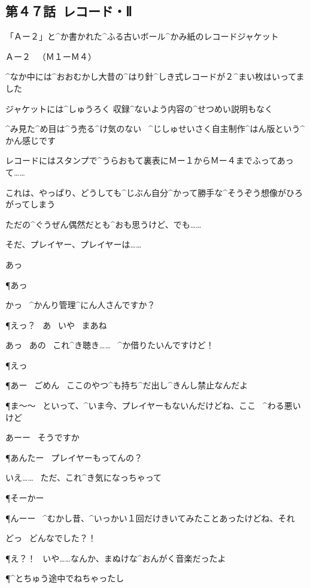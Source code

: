 \subsection{第４７話\ レコード・Ⅱ}

\page[53]
\K 「Ａー２」と^{か}{書}かれた^{ふる}{古}いボール^{かみ}{紙}のレコードジャケット

\Sign Ａー２
\ （Ｍ１ーＭ４）

\K ^{なか}{中}には^{おおむかし}{大昔}の^{はり}{針}^{しき}{式}レコードが２^{まい}{枚}はいってました

\page
\K ジャケットには^{しゅうろく }{収録}^{ないよう}{内容}の^{せつめい}{説明}もなく

\K ^{み}{見}た^{め}{目}は^{う}{売}る^{け}{気}のない
\ ^{じしゅせいさく}{自主制作}^{はん}{版}という^{かん}{感}じです

\K レコードにはスタンプで^{うらおもて}{裏表}にＭー１からＭー４までふってあって……

\K これは、やっぱり、どうしても^{じぶん}{自分}^{かって}{勝手}な^{そうぞう}{想像}がひろがってしまう

\page
\K ただの^{ぐうぜん}{偶然}だとも^{おも}{思}うけど、でも……

\K そだ、プレイヤー、プレイヤーは……

\page
\K あっ

\P あっ

\K かっ
\ ^{かんり}{管理}^{にん}{人}さんですか？

\P えっ？
\ あ
\ いや
\ まあね

\K あっ
\ あの
\ これ^{き}{聴}き……
\ ^{か}{借}りたいんですけど！

\P えっ

\P あー
\ ごめん
\ ここのやつ^{も}{持}ち^{だ}{出}し^{きんし}{禁止}なんだよ

\page
\P ま〜〜
\ といって、^{いま}{今}、プレイヤーもないんだけどね、ここ
\ ^{わる}{悪}いけど

\K あーー
\ そうですか

\P あんたー
\ プレイヤーもってんの？

\K いえ……
\ ただ、これ^{き}{気}になっちゃって

\page
\P そーかー

\P んーー
\ ^{むかし}{昔}、^{いっかい}{１回}だけきいてみたことあったけどね、それ

\K どっ
\ どんなでした？！

\P え？！
\ いや……なんか、まぬけな^{おんがく}{音楽}だったよ

\P ^{とちゅう}{途中}でねちゃったし

